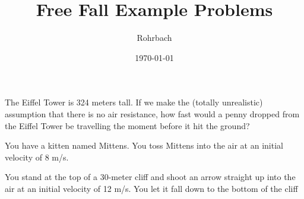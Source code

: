 \documentclass[10pt]{exam}
\title{Free Fall Example Problems}
\author{Rohrbach}
\date{\today}
\begin{document}
\maketitle


\begin{questions}
  \question  
    The Eiffel Tower is 324 meters tall.  If we make the (totally unrealistic) assumption that there is no air resistance, how fast would a penny dropped from the Eiffel Tower be travelling the moment before it hit the ground?
    \vspace{5cm}

  \question
    You have a kitten named Mittens.  You toss Mittens into the air at an initial velocity of 8 m/s.  
    
    \vs
    
  \pagebreak


  \question
    You stand at the top of a 30-meter cliff and shoot an arrow straight up into the air at an initial velocity of 12 m/s.  You let it fall down to the bottom of the cliff

    \vspace{30em}




\end{questions}
\end{document}
